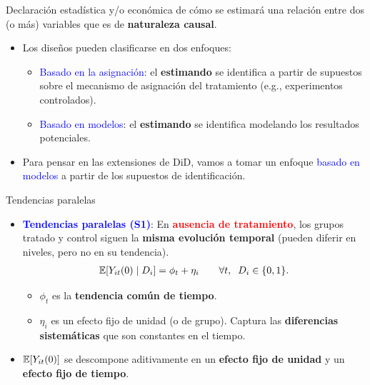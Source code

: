 \documentclass[10pt, xcolor=dvipsnames]{beamer}
\begin{document}
\begin{frame}[plain]
    \begin{tcolorbox}[colback=white, title=Diseño de investigación (causal), arc=0mm, boxrule=0.5pt, breakable]
        Declaración estadística y/o económica de cómo se estimará una relación entre dos (o más) variables que es de \textbf{naturaleza causal}.
    \end{tcolorbox}
    \vspace{1em}
    \begin{itemize}\setlength{\itemsep}{1.0em}
        \item Los diseños pueden clasificarse en dos enfoques:
        \begin{itemize}    
            \item \textcolor{blue}{Basado en la asignación}: el \textbf{estimando} se identifica a partir de supuestos sobre el mecanismo de asignación del tratamiento (e.g., experimentos controlados). %
            \vspace{0.5em}
            \item \textcolor{blue}{Basado en modelos}: el \textbf{estimando} se identifica modelando los resultados potenciales. %
        \end{itemize}
        \item Para pensar en las extensiones de DiD, vamos a tomar un enfoque \textcolor{blue}{basado en modelos} a partir de los supuestos de identificación. 
    \end{itemize}    
\end{frame}


\begin{frame}{Tendencias paralelas}
\begin{itemize}\setlength{\itemsep}{1.0em}
    \item \textbf{\textcolor{blue}{Tendencias paralelas (S1)}}: En \textcolor{red}{\textbf{ausencia de tratamiento}}, los grupos tratado y control siguen la \textbf{misma evolución temporal} (pueden diferir en niveles, pero no en su tendencia).
    \begin{align*}
        \operatorname{\mathbb{E}}[Y_{it}(0) \mid D_i] = \phi_t + \eta_i \qquad \forall t, \;\; D_i \in \{0,1\}.
    \end{align*}
    \vspace{-1em}
    \begin{itemize}
        \item $\phi_t$ es la \textbf{tendencia común de tiempo}.
        \item $\eta_i$ es un efecto fijo de unidad (o de grupo). Captura las \textbf{diferencias sistemáticas} que son constantes en el tiempo.
    \end{itemize}
    \smallspace
    \item[$\implies$] $\operatorname{\mathbb{E}}[Y_{it}(0)]$ se descompone aditivamente en un \textbf{efecto fijo de unidad} y un \textbf{efecto fijo de tiempo}.
\end{itemize}	
\end{frame}
\end{document}
